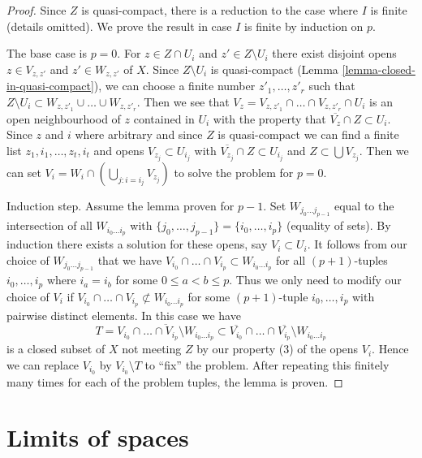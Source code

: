 \begin{proof}
Since $Z$ is quasi-compact, there is a reduction to the
case where $I$ is finite (details omitted).
We prove the result in case $I$ is finite by induction on $p$.

\medskip\noindent
The base case is $p = 0$.
For $z \in Z \cap U_i$ and $z' \in Z \setminus U_i$ there exist
disjoint opens $z \in V_{z, z'}$ and $z' \in W_{z, z'}$ of $X$.
Since $Z \setminus U_i$ is quasi-compact
(Lemma \ref{lemma-closed-in-quasi-compact}),
we can choose a finite number $z'_1, \ldots, z'_r$ such that
$Z \setminus U_i \subset W_{z, z'_1} \cup \ldots \cup W_{z, z'_r}$.
Then we see that
$V_z = V_{z, z'_1} \cap \ldots \cap V_{z, z'_r} \cap U_i$
is an open neighbourhood of $z$ contained in $U_i$
with the property that $\overline{V_z} \cap Z \subset U_i$.
Since $z$ and $i$ where arbitrary and since $Z$ is quasi-compact
we can find a finite list $z_1, i_1, \ldots, z_t, i_t$
and opens $V_{z_j} \subset U_{i_j}$ with
$\overline{V_{z_j}} \cap Z \subset U_{i_j}$
and $Z \subset \bigcup V_{z_j}$.
Then we can set $V_i = W_i \cap (\bigcup_{j : i = i_j} V_{z_j})$
to solve the problem for $p = 0$.

\medskip\noindent
Induction step. Assume the lemma proven for $p - 1$.
Set $W_{j_0 \ldots j_{p - 1}}$ equal to the intersection of
all $W_{i_0 \ldots i_p}$ with
$\{j_0, \ldots, j_{p - 1}\} = \{i_0, \ldots, i_p\}$ (equality of sets).
By induction there exists a solution for these opens, say
$V_i \subset U_i$.
It follows from our choice of $W_{j_0 \ldots j_{p - 1}}$ that we have
$V_{i_0} \cap \ldots \cap V_{i_p} \subset W_{i_0 \ldots i_p}$
for all $(p + 1)$-tuples $i_0, \ldots, i_p$ where $i_a = i_b$ for
some $0 \leq a < b \leq p$.
Thus we only need to modify our choice of
$V_i$ if $V_{i_0} \cap \ldots \cap V_{i_p} \not \subset W_{i_0 \ldots i_p}$
for some $(p + 1)$-tuple $i_0, \ldots, i_p$ with pairwise distinct elements.
In this case we have
$$
T =
\overline{V_{i_0} \cap \ldots \cap V_{i_p} \setminus W_{i_0 \ldots i_p}}
\subset
\overline{V_{i_0}} \cap \ldots \cap \overline{V_{i_p}} \setminus
W_{i_0 \ldots i_p}
$$
is a closed subset of $X$ not meeting $Z$ by our property (3) of the
opens $V_i$. Hence we can replace $V_{i_0}$ by $V_{i_0} \setminus T$
to ``fix'' the problem. After repeating this finitely many times for each
of the problem tuples, the lemma is proven.
\end{proof}






\section{Limits of spaces}
\label{section-limits}

